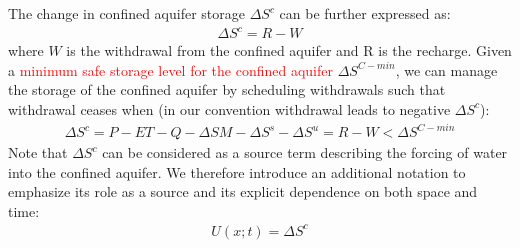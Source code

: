 \documentclass[11pt,final]{article}%
\renewcommand{\citep}{\cite}
\begin{document}
The change in confined aquifer storage $\Delta S^c$ can be further expressed as:
\begin{align}
\Delta S^c = R - W
\label{eq:confinedStorage}  
\end{align}
where $W$ is the withdrawal from the confined aquifer and R is the recharge. Given a \textcolor{red}{minimum safe storage level for the confined aquifer} $\Delta S^{C-min}$, we can manage the storage of the confined aquifer by scheduling withdrawals such that withdrawal ceases when (in our convention withdrawal leads to negative $\Delta S^c$):
\begin{align}
\Delta S^c = P-ET-Q-\Delta SM - \Delta S^s - \Delta S^u = R-W < \Delta S^{C-min}
\label{eq:safelimit}  
\end{align}
Note that $\Delta S^c$  can be considered as a source term describing the forcing of water into the confined aquifer.  We therefore introduce an additional notation to emphasize its role as a source and its explicit dependence on both space and time:
\begin{align}
U(x;t) = \Delta S^c
\label{eq:force}  
\end{align}

\end{document}
